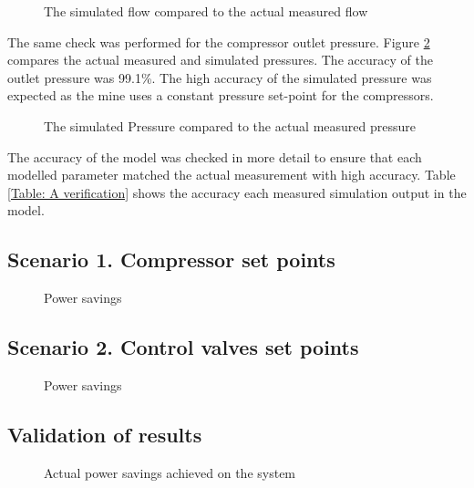 \begin{figure}[h]
	\centering
	
	\caption{The simulated flow compared to the actual measured flow}
	\label{fig: Verification Flow Beatrix}
\end{figure}
The same check was performed for the compressor outlet pressure. Figure \ref{fig: Verification Pressure Beatrix} compares the actual measured and simulated pressures. The accuracy of the outlet pressure was 99.1\%. The high accuracy of the simulated pressure was expected as the mine uses a constant pressure set-point for the compressors.
\begin{figure}[h]
	\centering
	
	\caption{The simulated Pressure compared to the actual measured pressure}
	\label{fig: Verification Pressure Beatrix}
\end{figure}
\par
The accuracy of the model was checked in more detail to ensure that each modelled parameter matched the actual measurement with high accuracy. Table \ref{Table: A verification} shows the accuracy each measured simulation output in the model. 
\subsection{Scenario 1. Compressor set points}
\begin{figure}[h!]
	\centering
	
	\caption{Power savings}
	\label{fig: CompSetpoints Results Beatrix}
\end{figure}
\subsection{Scenario 2. Control valves set points}

\begin{figure}[h!]
	\centering
	
	\caption{Power savings}
	\label{fig: Control Valve Results Beatrix}
\end{figure}
\subsection{Validation of results}
\begin{figure}[h!]
	\centering
	
	\caption{Actual power savings achieved on the system}
	\label{fig: Actual permormance beet}
\end{figure}
